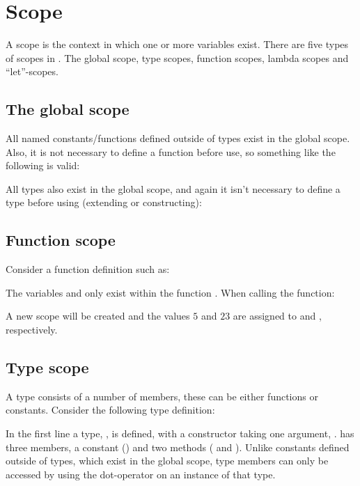 \section{Scope}
\label{sec:scoping}

A scope is the context in which one or more variables exist.
There are five types of scopes in \productname{}. The global scope,
type scopes, function scopes, lambda scopes and
``let''-scopes.

\subsection{The global scope}

All named constants/functions defined outside of types exist in the global scope.
Also, it is not necessary to define a function before use, so something
like the following is valid:


All types also exist in the global scope, and again it isn't necessary to define
a type before using (extending or constructing):


\subsection{Function scope}
Consider a function definition such as:


The variables  and  only exist within the function .
When calling the function:


A new scope will be created and the values $5$ and $23$
are assigned to  and , respectively.


\subsection{Type scope}

A type consists of a number of members, these can be either functions or constants.
Consider the following type definition:


In the first line a type, , is defined, with a constructor taking one
argument, .  has three members, a constant ()
and two methods ( and ). Unlike constants defined
outside of types, which exist in the global scope, type members can only be accessed by
using the dot-operator on an instance of that type.

